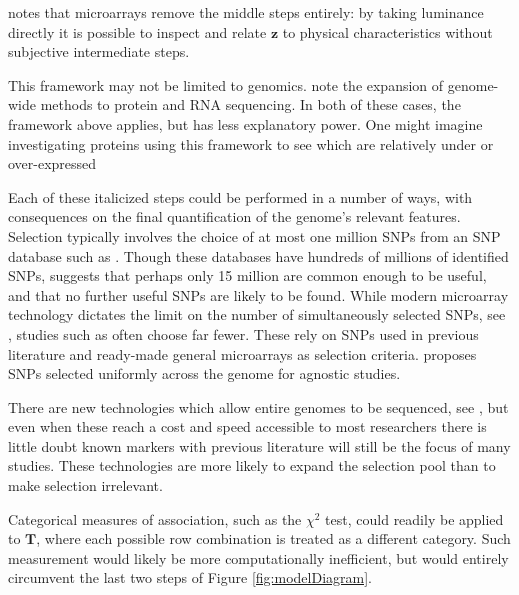 \documentclass{article}
\newcommand{\ve}[1]{\mathbf{#1}}           %
\newcommand{\m}[1]{\mathbf{#1}}               %
\begin{document}
\cite{laframboise2009} notes that microarrays remove the middle steps entirely: by taking luminance directly it is possible to inspect and relate $\ve{z}$ to physical characteristics without subjective intermediate steps.

This framework may not be limited to genomics. \cite{hasinetal2017multi} note the expansion of genome-wide methods to protein and RNA sequencing. In both of these cases, the framework above applies, but has less explanatory power. One might imagine investigating proteins using this framework to see which are relatively under or over-expressed

Each of these italicized steps could be performed in a number of ways, with consequences on the final quantification of the genome's relevant features. Selection typically involves the choice of at most one million SNPs from an SNP database such as \cite{NCBIdbSNP}. Though these databases have hundreds of millions of identified SNPs, \cite{koboldtetal2013next} suggests that perhaps only 15 million are common enough to be useful, and that no further useful SNPs are likely to be found. While modern microarray technology dictates the limit on the number of simultaneously selected SNPs, see \cite{laframboise2009, tametal2019benefits}, studies such as \cite{assimesetal2016cadgwas} often choose far fewer. These rely on SNPs used in previous literature and ready-made general microarrays as selection criteria. \cite{LanderBotstein1989} proposes SNPs selected uniformly across the genome for agnostic studies.

There are new technologies which allow entire genomes to be sequenced, see \cite{heatherchain2016sequencers, hasinetal2017multi, uffelmannetal2021gwas}, but even when these reach a cost and speed accessible to most researchers there is little doubt known markers with previous literature will still be the focus of many studies. These technologies are more likely to expand the selection pool than to make selection irrelevant.

Categorical measures of association, such as the $\chi^2$ test, could readily be applied to $\m{T}$, where each possible row combination is treated as a different category. Such measurement would likely be more computationally inefficient, but would entirely circumvent the last two steps of Figure \ref{fig:modelDiagram}. 



\renewcommand*{\bibname}{References} %

\end{document}
